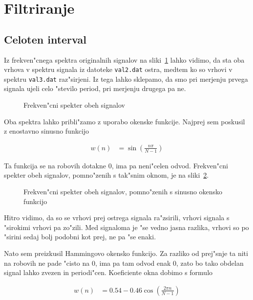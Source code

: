 \documentclass[a4paper,10pt]{article}
\begin{document}
\section{Filtriranje}

\subsection{Celoten interval}

Iz frekven"cnega spektra originalnih signalov na sliki~\ref{fig:val-fft} lahko vidimo, da sta oba vrhova v spektru signala iz datoteke \texttt{val2.dat} ostra, medtem ko so vrhovi v spektru \texttt{val3.dat} raz"sirjeni. Iz tega lahko sklepamo, da smo pri merjenju prvega signala ujeli celo "stevilo period, pri merjenju drugega pa ne. 

\begin{figure}[h]
 
\caption{Frekven"cni spekter obeh signalov}
\label{fig:val-fft}
\end{figure}

Oba spektra lahko pribli"zamo z uporabo okenske funkcije. Najprej sem poskusil z enostavno sinusno funkcijo

\begin{align}
 w(n) &= \sin(\frac{n\pi}{N-1})
\end{align}

Ta funkcija se na robovih dotakne 0, ima pa neni"celen odvod. Frekven"cni spekter obeh signalov, pomno"zenih s tak"snim oknom, je na sliki~\ref{fig:val-cos}. 

\begin{figure}[h]
 
\caption{Frekven"cni spekter obeh signalov, pomno"zenih s sinusno okensko funkcijo}
\label{fig:val-cos}
\end{figure}

Hitro vidimo, da so se vrhovi prej ostrega signala ra"zsirili, vrhovi signala s "sirokimi vrhovi pa zo"zili. Med signaloma je "se vedno jasna razlika, vrhovi so po "sirini sedaj bolj podobni kot prej, ne pa "se enaki. 

Nato sem preizkusil Hammingovo okensko funkcijo. Za razliko od prej"snje ta niti na robovih ne pade "cisto na 0, ima pa tam odvod enak 0, zato bo tako obdelan signal lahko zvezen in periodi"cen. Koeficiente okna dobimo s formulo

\begin{align}
 w(n) &= 0.54 - 0.46 \cos \left(\frac{2\pi n}{N-1}\right)
\end{align}
\end{document}
